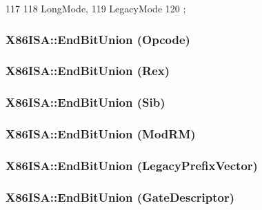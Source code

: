 \begin{DoxyCode}
117                  {
118         LongMode,
119         LegacyMode
120     };
\end{DoxyCode}
\hypertarget{namespaceX86ISA_a7a403bd01ec592764b6f32eb899ddb93}{
\subsubsection[{EndBitUnion}]{\setlength{\rightskip}{0pt plus 5cm}X86ISA::EndBitUnion (Opcode)}}
\label{namespaceX86ISA_a7a403bd01ec592764b6f32eb899ddb93}
\hypertarget{namespaceX86ISA_a55b670a53f749beaf53363e80f49bdaa}{
\subsubsection[{EndBitUnion}]{\setlength{\rightskip}{0pt plus 5cm}X86ISA::EndBitUnion (Rex)}}
\label{namespaceX86ISA_a55b670a53f749beaf53363e80f49bdaa}
\hypertarget{namespaceX86ISA_a8cf6dc92323e70f74dd36007b5511023}{
\subsubsection[{EndBitUnion}]{\setlength{\rightskip}{0pt plus 5cm}X86ISA::EndBitUnion (Sib)}}
\label{namespaceX86ISA_a8cf6dc92323e70f74dd36007b5511023}
\hypertarget{namespaceX86ISA_a142b63108443fe0184a873a564a9762e}{
\subsubsection[{EndBitUnion}]{\setlength{\rightskip}{0pt plus 5cm}X86ISA::EndBitUnion (ModRM)}}
\label{namespaceX86ISA_a142b63108443fe0184a873a564a9762e}
\hypertarget{namespaceX86ISA_a8868c98c46358c493fc04e89771d8c73}{
\subsubsection[{EndBitUnion}]{\setlength{\rightskip}{0pt plus 5cm}X86ISA::EndBitUnion (LegacyPrefixVector)}}
\label{namespaceX86ISA_a8868c98c46358c493fc04e89771d8c73}
\hypertarget{namespaceX86ISA_aab653d3e00074b5297080e982bfbdbde}{
\subsubsection[{EndBitUnion}]{\setlength{\rightskip}{0pt plus 5cm}X86ISA::EndBitUnion (GateDescriptor)}}
